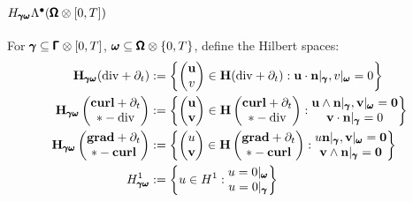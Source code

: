         \subsection*{$H_{\pmb{\mathsf{\gamma}}\pmb{\mathsf{\omega}}}\Lambda^{\bullet}(\pmb{\mathsf{\Omega}}\otimes[0, T])$}
            For $\pmb{\mathsf{\gamma}}  \subseteq  \pmb{\mathsf{\Gamma}}\otimes[0, T]$, $\pmb{\mathsf{\omega}}  \subseteq  \pmb{\mathsf{\Omega}}\otimes\{0, T\}$, define the Hilbert spaces:
            \begin{align}
                \mathbf{H}_{\pmb{\mathsf{\gamma}}\pmb{\mathsf{\omega}}}(\mathrm{div} + \partial_{t})  &:=  \left\{\begin{pmatrix} \mathbf{u} \\ v \end{pmatrix} \in \mathbf{H}(\mathrm{div} + \partial_{t}) : \mathbf{u}\cdot\mathbf{n}|_{\pmb{\mathsf{\gamma}}}, v|_{\pmb{\mathsf{\omega}}} = 0\right\}  \\
                \mathbf{H}_{\pmb{\mathsf{\gamma}}\pmb{\mathsf{\omega}}}\left(\begin{matrix} \mathbf{curl} + \partial_{t} \\ * - \mathrm{div} \end{matrix}\right)  &:=  \left\{\begin{pmatrix} \mathbf{u} \\ \mathbf{v} \end{pmatrix} \in \mathbf{H}\left(\begin{matrix} \mathbf{curl} + \partial_{t} \\ * - \mathrm{div} \end{matrix}\right) : \begin{matrix} \mathbf{u}\wedge\mathbf{n}|_{\pmb{\mathsf{\gamma}}}, \mathbf{v}|_{\pmb{\mathsf{\omega}}} = \mathbf{0} \\ \mathbf{v}\cdot\mathbf{n}|_{\pmb{\mathsf{\gamma}}} = 0 \end{matrix}\right\}  \\
                \mathbf{H}_{\pmb{\mathsf{\gamma}}\pmb{\mathsf{\omega}}}\left(\begin{matrix} \mathbf{grad} + \partial_{t} \\ * - \mathbf{curl} \end{matrix}\right)  &:=  \left\{\begin{pmatrix} u \\ \mathbf{v} \end{pmatrix} \in \mathbf{H}\left(\begin{matrix} \mathbf{grad} + \partial_{t} \\ * - \mathbf{curl} \end{matrix}\right) : \begin{matrix} u\mathbf{n}|_{\pmb{\mathsf{\gamma}}}, \mathbf{v}|_{\pmb{\mathsf{\omega}}} = \mathbf{0} \\ \mathbf{v}\wedge\mathbf{n}|_{\pmb{\mathsf{\gamma}}} = \mathbf{0} \end{matrix}\right\}  \\
                H^{1}_{\pmb{\mathsf{\gamma}}\pmb{\mathsf{\omega}}}  &:=  \left\{u \in H^{1} : \begin{matrix} u = 0|_{\pmb{\mathsf{\omega}}} \\ u = 0|_{\pmb{\mathsf{\gamma}}} \end{matrix}\right\}
            \end{align}
